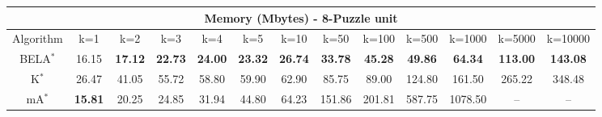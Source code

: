 \begin{tabular}{c|cccccccccccc}\toprule
\multicolumn{13}{c}{Memory (Mbytes) - 8-Puzzle unit}\\ \midrule
Algorithm & k=1 & k=2 & k=3 & k=4 & k=5 & k=10 & k=50 & k=100 & k=500 & k=1000 & k=5000 & k=10000 \\ \midrule
BELA$^*$ & 16.15 & \textbf{17.12} & \textbf{22.73} & \textbf{24.00} & \textbf{23.32} & \textbf{26.74} & \textbf{33.78} & \textbf{45.28} & \textbf{49.86} & \textbf{64.34} & \textbf{113.00} & \textbf{143.08} \\
K$^*$ & 26.47 & 41.05 & 55.72 & 58.80 & 59.90 & 62.90 & 85.75 & 89.00 & 124.80 & 161.50 & 265.22 & 348.48 \\
mA$^*$ & \textbf{15.81} & 20.25 & 24.85 & 31.94 & 44.80 & 64.23 & 151.86 & 201.81 & 587.75 & 1078.50 & -- & -- \\ \bottomrule 
\end{tabular}

